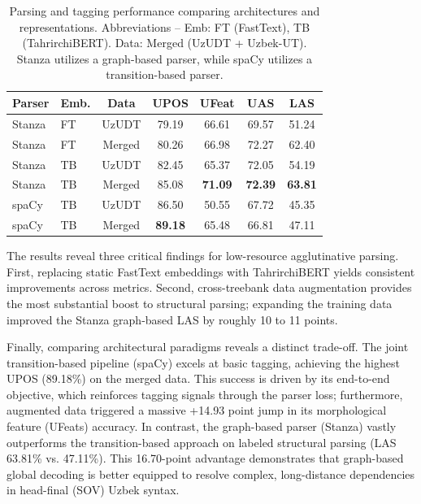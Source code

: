 \documentclass[10pt, a4paper]{article}
\begin{document}
\begin{table}[ht]
\centering
\small %
\setlength{\tabcolsep}{3.5pt} %
\begin{tabular}{llccccc}
\toprule
\textbf{Parser} & \textbf{Emb.} & \textbf{Data} & \textbf{UPOS} & \textbf{UFeat} & \textbf{UAS} & \textbf{LAS} \\
\midrule
Stanza & FT & UzUDT & 79.19 & 66.61 & 69.57 & 51.24 \\
Stanza & FT & Merged & 80.26 & 66.98 & 72.27 & 62.40 \\
Stanza & TB & UzUDT & 82.45 & 65.37 & 72.05 & 54.19 \\
Stanza & TB & Merged & 85.08 & \textbf{71.09} & \textbf{72.39} & \textbf{63.81} \\
\midrule
spaCy  & TB & UzUDT & 86.50 & 50.55 & 67.72 & 45.35 \\
spaCy  & TB & Merged & \textbf{89.18} & 65.48 & 66.81 & 47.11 \\
\bottomrule
\end{tabular}
\caption{Parsing and tagging performance comparing architectures and representations. Abbreviations -- Emb: FT (FastText), TB (TahrirchiBERT). Data: Merged (UzUDT + Uzbek-UT). Stanza utilizes a graph-based parser, while spaCy utilizes a transition-based parser.}
\label{tab:parser_performance}
\end{table}
The results reveal three critical findings for low-resource agglutinative parsing. First, replacing static FastText\cite{bojanowski-etal-2017-enriching, joulin2016fasttext} embeddings with TahrirchiBERT yields consistent improvements across metrics. Second, cross-treebank data augmentation provides the most substantial boost to structural parsing; expanding the training data improved the Stanza graph-based LAS by roughly 10 to 11 points.

Finally, comparing architectural paradigms reveals a distinct trade-off. The joint transition-based pipeline (spaCy) excels at basic tagging, achieving the highest UPOS (89.18\%) on the merged data. This success is driven by its end-to-end objective, which reinforces tagging signals through the parser loss; furthermore, augmented data triggered a massive +14.93 point jump in its morphological feature (UFeats) accuracy. In contrast, the graph-based parser (Stanza) vastly outperforms the transition-based approach on labeled structural parsing (LAS 63.81\% vs. 47.11\%). This 16.70-point advantage demonstrates that graph-based global decoding is better equipped to resolve complex, long-distance dependencies in head-final (SOV) Uzbek syntax.\cite{10.1007/978-3-031-05328-3_6}
\end{document}
